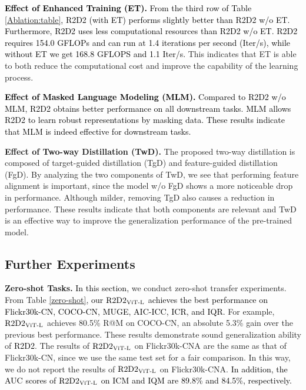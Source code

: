 \documentclass[sigconf]{acmart}
\def\ljc{\textcolor{black}}
\def\xie{\textcolor{black}}
\def\blue{\textcolor{black}}
\def\mmcr{\textcolor{black}}
\begin{document}
\ljc{
\textbf{Effect of Enhanced Training (ET).}
From the third row of Table \ref{Ablation:table},
\blue{\mmcr{R2D2} (with ET) performs slightly better than \mmcr{R2D2} w/o ET.} 
\blue{Furthermore,} \mmcr{R2D2} uses less computational resources than \mmcr{R2D2} w/o ET. \mmcr{R2D2} requires 154.0 GFLOPs and can run at 1.4 iterations per second (Iter/s), while without ET we get 168.8 GFLOPS and 1.1 Iter/s.}
This indicates that ET is able to both reduce the computational cost and improve the capability of the learning process.



\xie{
\textbf{Effect of Masked Language Modeling (MLM).}
Compared to \mmcr{R2D2} w/o MLM,
\mmcr{R2D2} obtains better performance on all downstream tasks.
{MLM allows \mmcr{R2D2} to learn robust representations by masking data.}
These results indicate that MLM is indeed effective for downstream tasks.
}

\textbf{Effect of Two-way Distillation (TwD).} The proposed two-way distillation is composed of target-guided distillation (TgD) and feature-guided distillation (FgD). 
By analyzing the two components of TwD, we see that performing feature alignment is important, since the model w/o FgD shows a more noticeable drop in performance.
Although milder, removing TgD also causes a reduction in performance.
These results indicate that both components are relevant and TwD is an effective way to improve the generalization performance of the pre-trained model.


\subsection{Further Experiments}
\label{sec:further_exp}
\textbf{Zero-shot Tasks.} 
\blue{In this section,}
we conduct zero-shot transfer experiments.
From Table \ref{zero-shot},
\blue{our $\text{\mmcr{R2D2}}_\text{ViT-L}$ achieves the best performance on Flickr30k-CN, COCO-CN, MUGE, AIC-ICC, ICR, and IQR.}
For example, $\text{\mmcr{R2D2}}_\text{ViT-L}$ achieves 80.5\% R@M on COCO-CN, an absolute 5.3\% gain over the previous best performance. 
These results demonstrate sound generalization ability of \mmcr{R2D2}.
The results of $\text{\mmcr{R2D2}}_\text{ViT-L}$ on Flickr30k-CNA are the same as that of Flickr30k-CN, since we use the same test set for a fair comparison.
In this way, we do not report the results of $\text{\mmcr{R2D2}}_\text{ViT-L}$ on Flickr30k-CNA.
\blue{In addition, the AUC scores of $\text{\mmcr{R2D2}}_\text{ViT-L}$ on ICM and IQM are 89.8\% and 84.5\%, respectively.}
\end{document}
